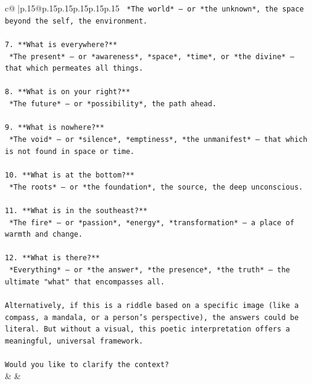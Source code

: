 \documentclass{article}
\begin{document}
{\begin{supertabular}{c@{$\;$}|p{.15\linewidth}@{}p{.15\linewidth}p{.15\linewidth}p{.15\linewidth}p{.15\linewidth}p{.15\linewidth}}
{{{\texttt{   *The world* — or *the unknown*, the space beyond the self, the environment.} \\
\\ 
\texttt{7. **What is everywhere?**  } \\
\texttt{   *The present* — or *awareness*, *space*, *time*, or *the divine* — that which permeates all things.} \\
\\ 
\texttt{8. **What is on your right?**  } \\
\texttt{   *The future* — or *possibility*, the path ahead.} \\
\\ 
\texttt{9. **What is nowhere?**  } \\
\texttt{   *The void* — or *silence*, *emptiness*, *the unmanifest* — that which is not found in space or time.} \\
\\ 
\texttt{10. **What is at the bottom?**  } \\
\texttt{   *The roots* — or *the foundation*, the source, the deep unconscious.} \\
\\ 
\texttt{11. **What is in the southeast?**  } \\
\texttt{   *The fire* — or *passion*, *energy*, *transformation* — a place of warmth and change.} \\
\\ 
\texttt{12. **What is there?**  } \\
\texttt{   *Everything* — or *the answer*, *the presence*, *the truth* — the ultimate "what" that encompasses all.} \\
\\ 
\texttt{Alternatively, if this is a riddle based on a specific image (like a compass, a mandala, or a person’s perspective), the answers could be literal. But without a visual, this poetic interpretation offers a meaningful, universal framework.} \\
\\ 
\texttt{Would you like to clarify the context?} \\
            }
        }
    }
    & & \\ \\


\end{supertabular}}
\end{document}
